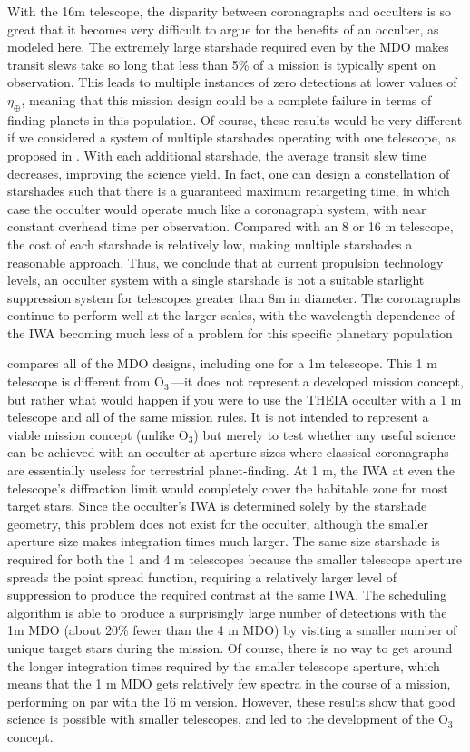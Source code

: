  With the 16m telescope, the disparity between coronagraphs and occulters is so great that it becomes very difficult to argue for the benefits of an occulter, as modeled here.  The extremely large starshade required even by the MDO makes transit slews take so long that less than 5\% of a mission is typically spent on observation. This leads to multiple instances of zero detections at lower values of $\eta_\oplus$, meaning that this mission design could be a complete failure in terms of finding planets in this population.  Of course, these results would be very different if we considered a system of multiple starshades operating with one telescope, as proposed in \citet{hunyadi2007a}.  With each additional starshade, the average transit slew time decreases, improving the science yield.  In fact, one can design a constellation of starshades such that there is a guaranteed maximum retargeting time, in which case the occulter would operate much like a coronagraph system, with near constant overhead time per observation.  Compared with an 8 or 16 m  telescope, the cost of each starshade is relatively low, making multiple starshades a reasonable approach.  Thus, we conclude that at current propulsion technology levels, an occulter system with a single starshade is not a suitable starlight suppression system for telescopes greater than 8m in diameter.  The coronagraphs continue to perform well at the larger scales, with the wavelength dependence of the IWA becoming much less of a problem for this specific planetary population

  compares all of the MDO designs, including one for a 1m telescope.  This 1 m telescope is different from O$_3$\,---it does not represent a developed mission concept, but rather what would happen if you were to use the THEIA occulter with a 1 m telescope and all of the same mission rules.  It is not intended to represent a viable mission concept (unlike O$_3$) but merely to test whether any useful science can be achieved with an occulter at aperture sizes where classical coronagraphs are essentially useless for terrestrial planet-finding.  At 1 m, the IWA at even the telescope's diffraction limit would completely cover the habitable zone for most target stars.  Since the occulter's IWA is determined solely by the starshade geometry, this problem does not exist for the occulter, although the smaller aperture size makes integration times much larger.  The same size starshade is required for both the 1 and 4 m telescopes because the smaller telescope aperture spreads the point spread function, requiring a relatively larger level of suppression to produce the required contrast at the same IWA. The scheduling algorithm is able to produce a surprisingly large number of detections with the 1m MDO (about 20\% fewer than the 4 m MDO) by visiting a smaller number of unique target stars during the mission.  Of course, there is no way to get around the longer integration times required by the smaller telescope aperture, which means that the 1 m MDO gets relatively few spectra in the course of a mission, performing on par with the 16 m version.  However, these results show that good science is possible with smaller telescopes, and led to the development of the O$_3$ concept.  
 
